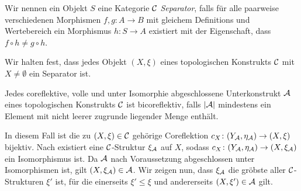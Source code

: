 \begin{defn}
  Wir nennen ein Objekt $S$ eine Kategorie $\mathcal{C}$ \emph{Separator}, falls für alle paarweise verschiedenen Morphismen $f,g \colon A \to B$ mit gleichem Definitions und Wertebereich ein Morphismus $h \colon S \to A$ existiert mit der Eigenschaft, dass $f \circ h \neq g \circ h$.
\end{defn}

Wir halten fest, dass jedes Objekt $(X,\xi)$ eines topologischen Konstrukts $\mathcal{C}$ mit $X \neq \emptyset$ ein Separator ist.

\begin{bem}[2.2.11, S.65]
  Jedes coreflektive, volle und unter Isomorphie abgeschlossene Unterkonstrukt $\mathcal{A}$ eines topologischen Konstrukts $\mathcal{C}$ ist bicoreflektiv, falls $|\mathcal{A}|$ mindestens ein Element mit nicht leerer zugrunde liegender Menge enthält.

  In diesem Fall ist die zu $(X, \xi) \in \mathcal{C}$ gehörige Coreflektion $c_X \colon (Y_{\mathcal{A}}, \eta_{\mathcal{A}}) \to (X, \xi)$ bijektiv.
  Nach \cite[1.2.2.7]{preuss} existiert eine $\mathcal{C}$-Struktur $\xi_{\mathcal{A}}$ auf $X$, sodass $c_X \colon (Y_{\mathcal{A}}, \eta_{\mathcal{A}}) \to (X, \xi_{\mathcal{A}})$ ein Isomorphismus ist.
  Da $\mathcal{A}$ nach Voraussetzung abgeschlossen unter Isomorphismen ist, gilt $(X, \xi_{\mathcal{A}})\in \mathcal{A}$.
  Wir zeigen nun, dass $\xi_{\mathcal{A}}$ die gröbste aller $\mathcal{C}$-Strukturen $\xi'$ ist, für die einerseits $\xi' \leq \xi$ und andererseits $(X, \xi') \in \mathcal{A}$ gilt.

\end{bem}

\begin{thm}[2.2.12, S.66]
  
\end{thm}

